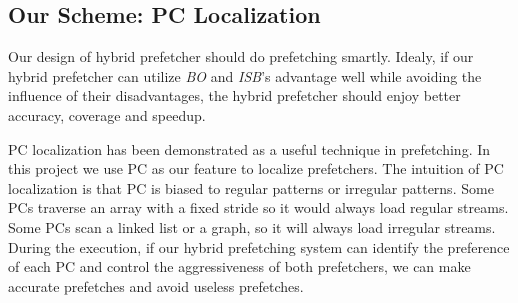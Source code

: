 \subsection{Our Scheme: PC Localization}
  \label{sec:goal}
  Our design of hybrid prefetcher should do prefetching smartly. Idealy, if our hybrid prefetcher can utilize \emph{BO} and \emph{ISB}'s advantage well while avoiding the influence of their disadvantages, the hybrid prefetcher should enjoy better accuracy, coverage and speedup. \par
  PC localization has been demonstrated as a useful technique in prefetching\cite{isbpaper, ghbpaper, shippaper}. In this project we use PC as our feature to localize prefetchers. The intuition of PC localization is that PC is biased to regular patterns or irregular patterns.
  Some PCs traverse an array with a fixed stride so it would always load regular streams. Some PCs scan a linked list or a graph, so it will always load irregular streams.
  During the execution, if our hybrid prefetching system can identify the preference of each PC and control the aggressiveness of both prefetchers, we can make accurate prefetches and avoid useless prefetches. \par
